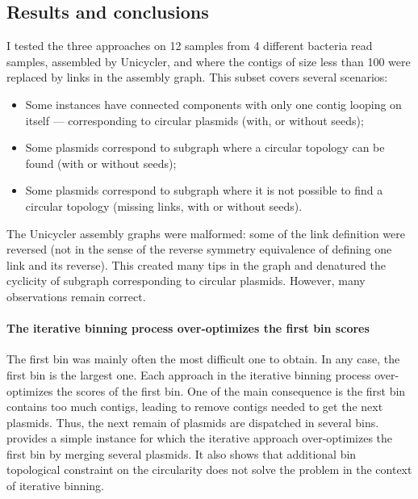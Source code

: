 \subsection{Results and conclusions}\label{sec:pbf_iterbin:conclusions}

I tested the three approaches on 12 samples from 4 different bacteria read samples, assembled by Unicycler, and where the contigs of size less than 100 were replaced by links in the assembly graph.
This subset covers several scenarios:

\begin{itemize}
  \item Some instances have connected components with only one contig looping on itself --- corresponding to circular plasmids (with, or without seeds);
  \item Some plasmids correspond to subgraph where a circular topology can be found (with or without seeds);
  \item Some plasmids correspond to subgraph where it is not possible to find a circular topology (missing links, with or without seeds).
\end{itemize}

\begin{warningbox}
  The Unicycler assembly graphs were malformed: some of the link definition were reversed (not in the sense of the reverse symmetry equivalence of defining one link and its reverse).
  This created many tips in the graph and denatured the cyclicity of subgraph corresponding to circular plasmids.
  However, many observations remain correct.
\end{warningbox}

\paragraph{The iterative binning process over-optimizes the first bin scores}
The first bin was mainly often the most difficult one to obtain.
In any case, the first bin is the largest one.
Each approach in the iterative binning process over-optimizes the scores of the first bin.
One of the main consequence is the first bin contains too much contigs, leading to remove contigs needed to get the next plasmids.
Thus, the next remain of plasmids are dispatched in several bins.
 provides a simple instance for which the iterative approach over-optimizes the first bin by merging several plasmids.
It also shows that additional bin topological constraint on the circularity does not solve the problem in the context of iterative binning.

